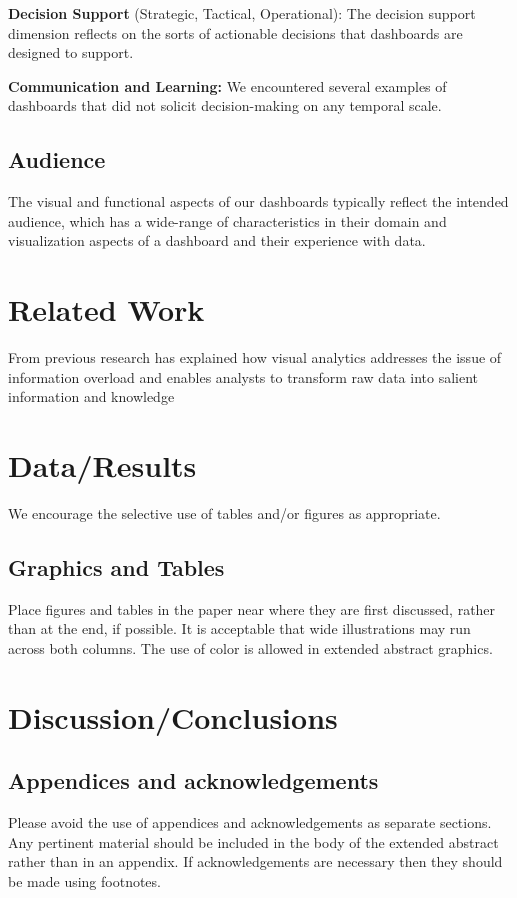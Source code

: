 \documentclass[10pt]{article}
\begin{document}
{\bf Decision Support} (Strategic, Tactical, Operational): The decision support dimension reflects on the sorts of actionable decisions that dashboards are designed to support.

{\bf Communication and Learning:} We encountered several examples of dashboards that did not solicit decision-making on any temporal scale.

\subsection{Audience}
The visual and functional aspects of our dashboards typically reflect the intended audience, which has a wide-range of characteristics in their domain and visualization aspects of a dashboard and their experience with data. 

\section{Related Work}
From previous research has explained how visual analytics addresses the issue of information overload and enables analysts to transform raw data into salient information and knowledge 


\section{Data/Results}

We encourage the selective use of tables and/or figures as appropriate.

\subsection{Graphics and Tables}

Place figures and tables in the
paper near where they are first discussed, rather than at the end, if
possible.  It is acceptable that wide illustrations
may run across both columns.  The use of color
is allowed in extended abstract graphics.


\section{Discussion/Conclusions}

\subsection{Appendices and acknowledgements}

Please avoid the use of appendices and acknowledgements 
as separate sections.  Any pertinent material should be included in the
body of the extended abstract rather than in an appendix.  If 
acknowledgements are necessary then they should be made using footnotes.
\end{document}
